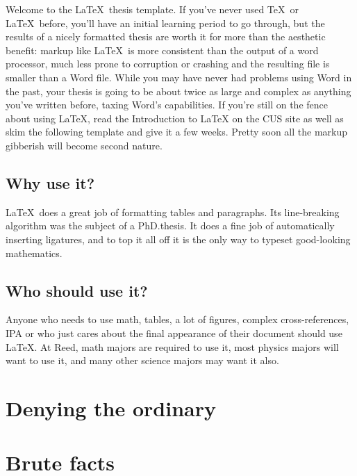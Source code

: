 \documentclass[12pt,twoside]{reedfancy}
\begin{document}
\begin{spacing}{1.25}
Welcome to the \LaTeX\ thesis template. If you've never used \TeX\ or \LaTeX\ before, you'll have an initial learning period to go through, but the results of a nicely formatted thesis are worth it for more than the aesthetic benefit: markup like \LaTeX\ is more consistent than the output of a word processor, much less prone to corruption or crashing and the resulting file is smaller than a Word file. While you may have never had problems using Word in the past, your thesis is going to be about twice as large and complex as anything you've written before, taxing Word's capabilities. If you're still on the fence about  using \LaTeX, read the Introduction to LaTeX on the CUS site as well as skim the following template and give it a few weeks. Pretty soon all the markup gibberish will become second nature.


\section{Why use it?}
	
\LaTeX\ does a great job of formatting tables and paragraphs. Its line-breaking algorithm was the subject of a PhD.\thinspace thesis. It does a fine job of automatically inserting ligatures, and to top it all off it is the only way to typeset good-looking mathematics.

\section{Who should use it?}

Anyone who needs to use math, tables, a lot of figures, complex cross-references, IPA or who just cares about the final appearance of their document should use \LaTeX. At Reed, math majors are required to use it, most physics majors will want to use it, and many other science majors may want it also.

%

\chapter{Denying the ordinary}
\label{deny}

	
\chapter{Brute facts}
\label{brute}



\end{spacing}
\end{document}
